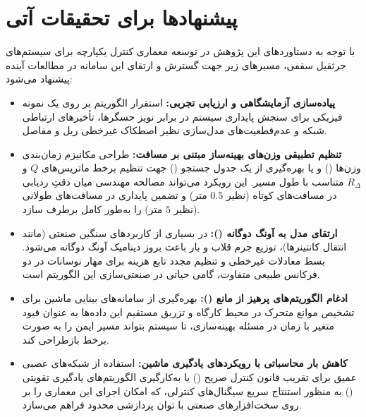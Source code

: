 
\section{پیشنهادها برای تحقیقات آتی}

با توجه به دستاوردهای این پژوهش در توسعه معماری کنترل یکپارچه برای سیستم‌های جرثقیل سقفی، مسیرهای زیر جهت گسترش و ارتقای این سامانه در مطالعات آینده پیشنهاد می‌شود:

\begin{itemize}
    \item \textbf{پیاده‌سازی آزمایشگاهی و ارزیابی تجربی:} استقرار الگوریتم  بر روی یک نمونه فیزیکی برای سنجش پایداری سیستم در برابر نویز حسگرها، تأخیرهای ارتباطی شبکه و عدم‌قطعیت‌های مدل‌سازی نظیر اصطکاک غیرخطی ریل و مفاصل.
    \item \textbf{تنظیم تطبیقی وزن‌های بهینه‌ساز مبتنی بر مسافت:} طراحی مکانیزم زمان‌بندی وزن‌ها () و یا بهره‌گیری از یک جدول جستجو () جهت تنظیم برخط ماتریس‌های $Q$ و $R_{\Delta}$ متناسب با طول مسیر. این رویکرد می‌تواند مصالحه مهندسی میان دقتِ ردیابی در مسافت‌های کوتاه (نظیر $0.5$ متر) و تضمین پایداری در مسافت‌های طولانی (نظیر $5$ متر) را به‌طور کامل برطرف سازد.
    \item \textbf{ارتقای مدل به آونگ دوگانه ():} در بسیاری از کاربردهای سنگین صنعتی (مانند انتقال کانتینرها)، توزیع جرم قلاب و بار باعث بروز دینامیک آونگ دوگانه می‌شود. بسط معادلات غیرخطی و تنظیم مجدد تابع هزینه برای مهار نوسانات در دو فرکانس طبیعی متفاوت، گامی حیاتی در صنعتی‌سازی این الگوریتم است.
    \item \textbf{ادغام الگوریتم‌های پرهیز از مانع ():} بهره‌گیری از سامانه‌های بینایی ماشین برای تشخیص موانع متحرک در محیط کارگاه و تزریق مستقیم این داده‌ها به عنوان قیود متغیر با زمان در مسئله بهینه‌سازی، تا سیستم بتواند مسیر ایمن را به صورت برخط بازطراحی کند.
    \item \textbf{کاهش بار محاسباتی با رویکردهای یادگیری ماشین:} استفاده از شبکه‌های عصبی عمیق برای تقریب قانون کنترل صریح () یا به‌کارگیری الگوریتم‌های یادگیری تقویتی () به منظور استنتاج سریع سیگنال‌های کنترلی، که امکان اجرای این معماری را بر روی سخت‌افزارهای صنعتی با توان پردازشی محدود فراهم می‌سازد.
\end{itemize}